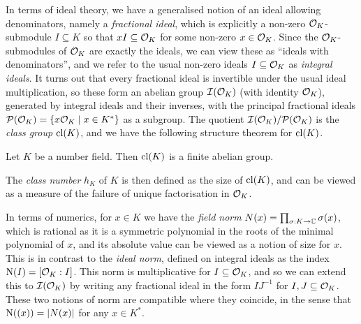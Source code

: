 \documentclass[11pt]{report}
\begin{document}
In terms of ideal theory, we have a generalised notion of an ideal allowing denominators, namely a \emph{fractional ideal}, which is explicitly a non-zero $\mathcal{O}_K$-submodule $I \subseteq K$ so that $xI \subseteq \mathcal{O}_K$ for some non-zero $x \in \mathcal{O}_K$. Since the $\mathcal{O}_K$-submodules of $\mathcal{O}_K$ are exactly the ideals, we can view these as ``ideals with denominators'', and we refer to the usual non-zero ideals $I \subseteq \mathcal{O}_K$ as \emph{integral ideals}. It turns out that every fractional ideal is invertible under the usual ideal multiplication, so these form an abelian group $\mathcal{I}(\mathcal{O}_K)$ (with identity $\mathcal{O}_K$), generated by integral ideals and their inverses, with the principal fractional ideals $\mathcal{P}(\mathcal{O}_K) = \left\{  x\mathcal{O}_K \mid x \in K^*  \right\}$ as a subgroup. The quotient $\mathcal{I}(\mathcal{O}_K) / \mathcal{P}(\mathcal{O}_K)$ is the \emph{class group} $\operatorname{cl}(K)$, and we have the following structure theorem for $\operatorname{cl}(K)$.
\begin{theorem}
    Let $K$ be a number field. Then $\operatorname{cl}(K)$ is a finite abelian group.
\end{theorem}
The \emph{class number} $h_K$ of $K$ is then defined as the size of $\operatorname{cl}(K)$, and can be viewed as a measure of the failure of unique factorisation in $\mathcal{O}_K$.

In terms of numerics, for $x \in K$ we have the \emph{field norm} $N(x) = \prod_{\sigma : K \to \mathbb{C}}\sigma(x)$, which is rational as it is a symmetric polynomial in the roots of the minimal polynomial of $x$, and its absolute value can be viewed as a notion of size for $x$. This is in contrast to the \emph{ideal norm}, defined on integral ideals as the index $\operatorname{N}(I) = [\mathcal{O}_K : I]$. This norm is multiplicative for $I \subseteq \mathcal{O}_K$, and so we can extend this to $\mathcal{I}(\mathcal{O}_K)$ by writing any fractional ideal in the form $IJ^{-1}$ for $I, J \subseteq \mathcal{O}_K$. These two notions of norm are compatible where they coincide, in the sense that $\operatorname{N}((x)) = \left| N(x) \right|$ for any $x \in K^*$.
\end{document}
